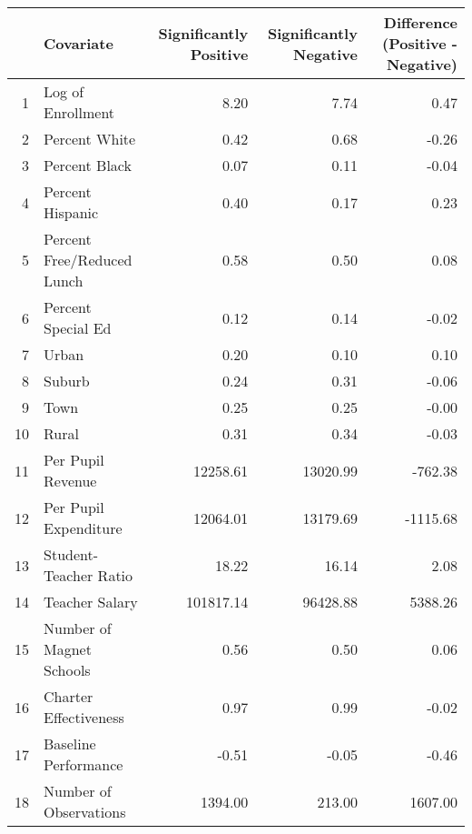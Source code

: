 \begin{tabular}{rlrrr}
  \hline
 & Covariate & Significantly Positive & Significantly Negative & Difference (Positive - Negative) \\ 
  \hline
1 & Log of Enrollment & 8.20 & 7.74 & 0.47 \\ 
  2 & Percent White & 0.42 & 0.68 & -0.26 \\ 
  3 & Percent Black & 0.07 & 0.11 & -0.04 \\ 
  4 & Percent Hispanic & 0.40 & 0.17 & 0.23 \\ 
  5 & Percent Free/Reduced Lunch & 0.58 & 0.50 & 0.08 \\ 
  6 & Percent Special Ed & 0.12 & 0.14 & -0.02 \\ 
  7 & Urban & 0.20 & 0.10 & 0.10 \\ 
  8 & Suburb & 0.24 & 0.31 & -0.06 \\ 
  9 & Town & 0.25 & 0.25 & -0.00 \\ 
  10 & Rural & 0.31 & 0.34 & -0.03 \\ 
  11 & Per Pupil Revenue & 12258.61 & 13020.99 & -762.38 \\ 
  12 & Per Pupil Expenditure & 12064.01 & 13179.69 & -1115.68 \\ 
  13 & Student-Teacher Ratio & 18.22 & 16.14 & 2.08 \\ 
  14 & Teacher Salary & 101817.14 & 96428.88 & 5388.26 \\ 
  15 & Number of Magnet Schools & 0.56 & 0.50 & 0.06 \\ 
  16 & Charter Effectiveness & 0.97 & 0.99 & -0.02 \\ 
  17 & Baseline Performance & -0.51 & -0.05 & -0.46 \\ 
  18 & Number of Observations & 1394.00 & 213.00 & 1607.00 \\ 
   \hline
\end{tabular}
